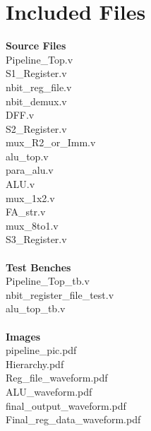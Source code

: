 \documentclass[letterpaper,12pt]{article}
\begin{document}
\section{Included Files}
\textbf{Source Files} \\
Pipeline\_Top.v \\
S1\_Register.v \\
nbit\_reg\_file.v \\
nbit\_demux.v \\
DFF.v \\
S2\_Register.v \\
mux\_R2\_or\_Imm.v \\
alu\_top.v \\
para\_alu.v \\
ALU.v \\
mux\_1x2.v \\
FA\_str.v \\
mux\_8to1.v \\
S3\_Register.v \\ \\
\textbf{Test Benches} \\
Pipeline\_Top\_tb.v \\
nbit\_register\_file\_test.v \\
alu\_top\_tb.v \\ \\
\textbf{Images} \\
pipeline\_pic.pdf \\
Hierarchy.pdf \\
Reg\_file\_waveform.pdf \\
ALU\_waveform.pdf \\
final\_output\_waveform.pdf \\
Final\_reg\_data\_waveform.pdf \\
\end{document}

